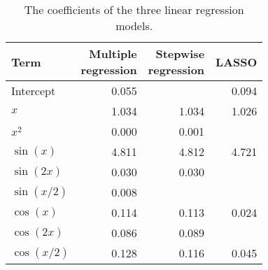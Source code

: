 \begin{table}[!h]

\caption{\label{tab:compare-coefs}The coefficients of the three linear regression models.}
\centering
\begin{tabular}{lrrr}
\toprule
Term & \makecell[r]{Multiple\\regression} & \makecell[r]{Stepwise\\regression} & LASSO\\
\midrule
Intercept & 0.055 &  & 0.094\\
\(x\) & 1.034 & 1.034 & 1.026\\
\(x^2\) & 0.000 & 0.001 & \\
\(\sin(x)\) & 4.811 & 4.812 & 4.721\\
\(\sin(2x)\) & 0.030 & 0.030 & \\
\(\sin(x/2)\) & 0.008 &  & \\
\(\cos(x)\) & 0.114 & 0.113 & 0.024\\
\(\cos(2x)\) & 0.086 & 0.089 & \\
\(\cos(x/2)\) & 0.128 & 0.116 & 0.045\\
\bottomrule
\end{tabular}
\end{table}